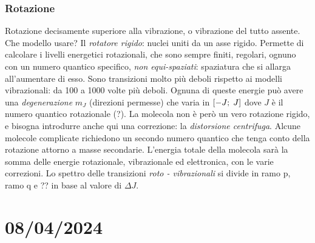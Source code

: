 \subsubsection{Rotazione}
Rotazione decisamente superiore alla vibrazione, o vibrazione del tutto assente. Che modello usare? Il \textit{rotatore rigido}: nuclei uniti da un asse rigido.
Permette di calcolare i livelli energetici rotazionali, che sono sempre finiti, regolari, ognuno con un numero quantico specifico, \textit{non equi-spaziati}: spaziatura che si allarga all'aumentare di esso.
Sono transizioni molto più deboli rispetto ai modelli vibrazionali: da 100 a 1000 volte più deboli.
Ognuna di queste energie può avere una \textit{degenerazione} $m_{J}$ (direzioni permesse) che varia in $[-J;\hspace{0.1cm}J]$ dove $J$ è il numero quantico rotazionale (?).
La molecola non è però un vero rotazione rigido, e bisogna introdurre anche qui una correzione: la \textit{distorsione centrifuga}.
Alcune molecole complicate richiedono un secondo numero quantico che tenga conto della rotazione attorno a masse secondarie.
L'energia totale della molecola sarà la somma delle energie rotazionale, vibrazionale ed elettronica, con le varie correzioni.
Lo spettro delle transizioni \textit{roto - vibrazionali} si divide in ramo p, ramo q e ?? in base al valore di $\Delta J$.
\section{08/04/2024}
